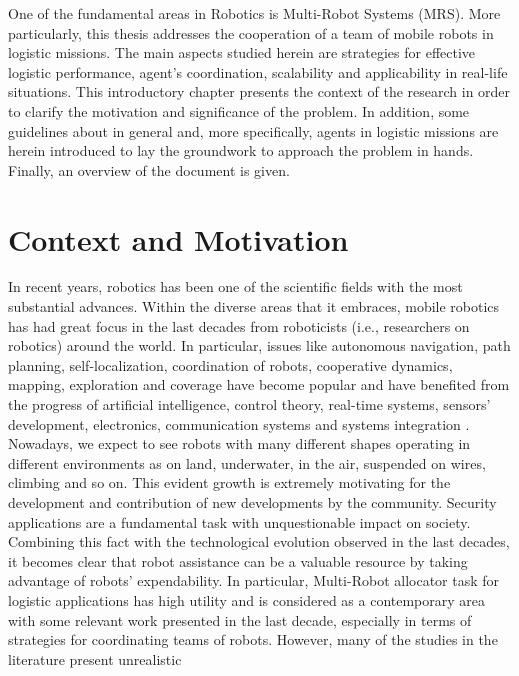 One of the fundamental areas in Robotics is Multi-Robot Systems (MRS). More particularly,
this thesis addresses the cooperation of a team of mobile robots in logistic missions.
The main aspects studied herein are strategies for effective logistic performance,
agent's coordination, scalability and applicability in real-life situations.
\newline
This introductory chapter presents the context of the research in order to clarify
the motivation and significance of the problem. 
In addition, some guidelines about \mrs in general and, more specifically,
agents in logistic missions are herein introduced to lay the groundwork to 
approach the problem in hands. 
Finally, an overview of the document is given. 

\section{Context and Motivation}
In recent years, robotics has been one of the scientific fields with the most substantial
advances. Within the diverse areas that it embraces, mobile robotics has
had great focus in the last decades from roboticists (i.e., researchers on robotics)
around the world. In particular, issues like autonomous navigation, path planning,
self-localization, coordination of robots, cooperative dynamics, mapping, exploration 
and coverage have become popular and have benefited from the progress
of artificial intelligence, control theory, real-time systems, sensors’ development,
electronics, communication systems and systems integration \cite{parker}.
\newline
Nowadays, we expect to see robots with many different shapes operating in
different environments as on land, underwater, in the air, suspended on wires,
climbing and so on. This evident growth is extremely motivating for the development
 and contribution of new developments by the community.
\newline
Security applications are a fundamental task with unquestionable impact on
society. Combining this fact with the technological evolution observed in the last
decades, it becomes clear that robot assistance can be a valuable resource by
taking advantage of robots’ expendability. In particular, Multi-Robot allocator task for logistic applications
has high utility and is considered as a contemporary area with some relevant work
presented in the last decade, especially in terms of strategies for coordinating
teams of robots. However, many of the studies in the literature present unrealistic
